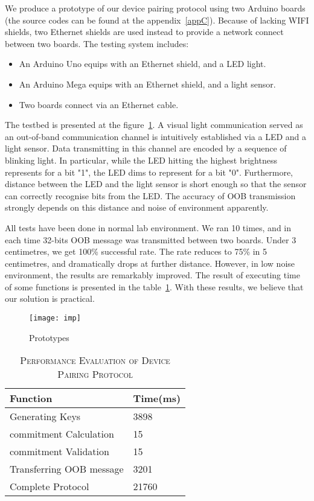 We produce a prototype of our device pairing protocol using two Arduino boards (the source codes can be found at the appendix~\ref{appC}). Because of lacking WIFI shields, two Ethernet shields are used instead to provide a network connect between two boards. The testing system includes:
\begin{itemize}
\item An Arduino Uno equips with an Ethernet shield, and a LED light.
\item An Arduino Mega equips with an Ethernet shield, and a light sensor.
\item Two boards connect via an Ethernet cable. 
\end{itemize}

The testbed is presented at the figure~\ref{imp}. A visual light communication served as an out-of-band communication channel is intuitively established via a LED and a light sensor. Data transmitting in this channel are encoded by a sequence of blinking light. In particular, while the LED hitting the highest brightness represents for a bit "1", the LED dims to represent for a bit "0". Furthermore, distance between the LED and the light sensor is short enough so that the sensor can correctly recognise bits from the LED. The accuracy of OOB transmission strongly depends on this distance and noise of environment apparently. 

All tests have been done in normal lab environment. We ran 10 times, and in each time 32-bits OOB message was transmitted between two boards. Under 3 centimetres, we get 100\% successful rate. The rate reduces to 75\% in 5 centimetres, and dramatically drops at further distance. However, in low noise environment, the results are remarkably improved. The result of executing time of some functions is presented in the table~\ref{evaluation}. With these results, we believe that our solution is practical.

\begin{figure}
  \centering
  \texttt{[image: imp]}
  \caption{Prototypes}
  \label{imp}
\end{figure}

\begin{table}[t]
\centering
\caption{\textsc{Performance Evaluation of Device Pairing Protocol}}
\label{evaluation}
{\small
\begin{tabular}{| p{5cm} | p{3cm} |}
 \hline
\textbf{Function} & \textbf{Time(ms)} \\ \hline \hline
Generating Keys & 3898 \\ \hline
commitment Calculation & 15 \\ \hline
commitment Validation & 15 \\ \hline
Transferring OOB message & 3201 \\ \hline
Complete Protocol & 21760 \\ \hline
\end{tabular}
}
\end{table}

